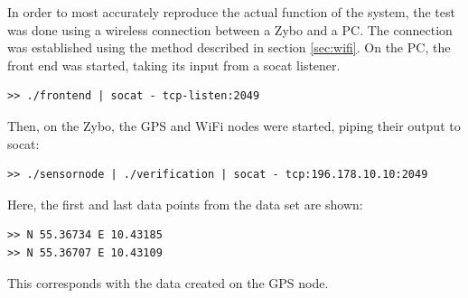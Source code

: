 In order to most accurately reproduce the actual function of the system, the test was done using a wireless connection between a Zybo and a PC.
The connection was established using the method described in section \ref{sec:wifi}.
On the PC, the front end was started, taking its input from a socat listener.
\begin{lstlisting}
>> ./frontend | socat - tcp-listen:2049
\end{lstlisting}
Then, on the Zybo, the GPS and WiFi nodes were started, piping their output to socat:
\begin{lstlisting}
>> ./sensornode | ./verification | socat - tcp:196.178.10.10:2049
\end{lstlisting}
Here, the first and last data points from the data set are shown:
\begin{lstlisting}
>> N 55.36734 E 10.43185
>> N 55.36707 E 10.43109
\end{lstlisting}
This corresponds with the data created on the GPS node.
